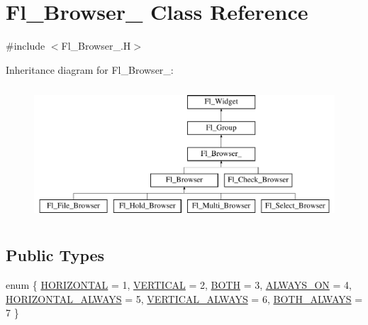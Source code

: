 \hypertarget{class_fl___browser__}{}\section{Fl\+\_\+\+Browser\+\_\+ Class Reference}
\label{class_fl___browser__}


{\ttfamily \#include $<$Fl\+\_\+\+Browser\+\_\+.\+H$>$}

Inheritance diagram for Fl\+\_\+\+Browser\+\_\+\+:\begin{figure}[H]
\begin{center}
\leavevmode
\includegraphics[height=5.000000cm]{class_fl___browser__}
\end{center}
\end{figure}
\subsection*{Public Types}
\begin{DoxyCompactItemize}
\item 
enum \{ \newline
\hyperlink{class_fl___browser___ae31c28a4c79819d686805fdd1e48698ea18547ff3d0f33220ebae43d040f82850}{H\+O\+R\+I\+Z\+O\+N\+T\+AL} = 1, 
\hyperlink{class_fl___browser___ae31c28a4c79819d686805fdd1e48698ea7bb46232e38930bcac3bd67c96cdaff5}{V\+E\+R\+T\+I\+C\+AL} = 2, 
\hyperlink{class_fl___browser___ae31c28a4c79819d686805fdd1e48698eaab8e1ce95f30ab95086a09f50fc9e7b6}{B\+O\+TH} = 3, 
\hyperlink{class_fl___browser___ae31c28a4c79819d686805fdd1e48698ea28f0b3b555121cd96c51ae991efb6c9b}{A\+L\+W\+A\+Y\+S\+\_\+\+ON} = 4, 
\newline
\hyperlink{class_fl___browser___ae31c28a4c79819d686805fdd1e48698ea565affd547be9e7d8d66ab078c2f32cf}{H\+O\+R\+I\+Z\+O\+N\+T\+A\+L\+\_\+\+A\+L\+W\+A\+YS} = 5, 
\hyperlink{class_fl___browser___ae31c28a4c79819d686805fdd1e48698ea0b766422c7c7e00c660f9685d0b167e9}{V\+E\+R\+T\+I\+C\+A\+L\+\_\+\+A\+L\+W\+A\+YS} = 6, 
\hyperlink{class_fl___browser___ae31c28a4c79819d686805fdd1e48698ea4af943b52ba7852580445055aaec0efc}{B\+O\+T\+H\+\_\+\+A\+L\+W\+A\+YS} = 7
 \}
\end{DoxyCompactItemize}
